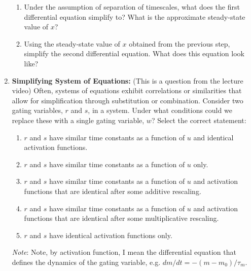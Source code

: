 \documentclass[11pt,letterpaper]{article}
\begin{document}
\begin{enumerate}
    \begin{enumerate}
        \item Under the assumption of separation of timescales, what does the first differential equation simplify to? What is the approximate steady-state value of $x$? 
        \vspace{2 cm}
        \item Using the steady-state value of $x$ obtained from the previous step, simplify the second differential equation. What does this equation look like? 
    \end{enumerate}
    \pagebreak

    \item \textbf{Simplifying System of Equations:} (This is a question from the lecture video) Often, systems of equations exhibit correlations or similarities that allow for simplification through substitution or combination. Consider two gating variables, $r$ and $s$, in a system. Under what conditions could we replace these with a single gating variable, $w$? Select the correct statement:
    \begin{enumerate}
    \item $r$ and $s$ have similar time constants as a function of $u$ and identical activation functions.
    \item $r$ and $s$ have similar time constants as a function of $u$ only.
    \item $r$ and $s$ have similar time constants as a function of $u$ and activation functions that are identical after some additive rescaling.
    \item $r$ and $s$ have similar time constants as a function of $u$ and activation functions that are identical after some multiplicative rescaling.
    \item $r$ and $s$ have identical activation functions only.
    \end{enumerate}
    \emph{Note}: Note, by activation function, I mean the differential equation that defines the dynamics of the gating variable, e.g. $dm / dt = -(m - m_0)/\tau_m$.

\end{enumerate}
\pagebreak
\end{document}
